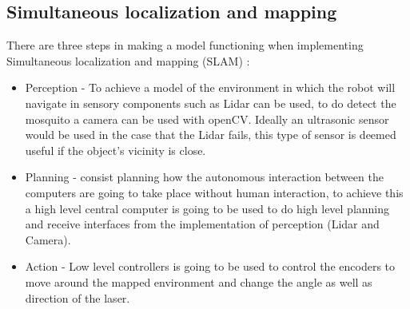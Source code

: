 \documentclass[11pt]{article}
\begin{document}
	\subsection{Simultaneous localization and mapping}
	There are three steps in making a model functioning when implementing Simultaneous localization and mapping (SLAM) :
	\begin{itemize}
		\item Perception - To achieve a model of the environment in which the robot will navigate in sensory components such as Lidar can be used, to do detect the mosquito a camera can be used with openCV. Ideally an ultrasonic sensor would be used in the case that the Lidar fails, this type of sensor is deemed useful if the object's vicinity is close.
		\item Planning - consist planning how the autonomous interaction between the computers are going to take place without human interaction, to achieve this a high level central computer is going to be used to do high level planning and receive interfaces from the implementation of perception (Lidar and Camera). 
		\item Action - Low level controllers is going to be used to control the encoders to move around the mapped environment and change the angle as well as direction of the laser.
	\end{itemize}
\end{document}
